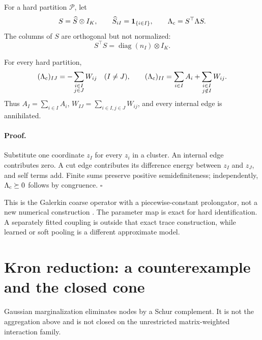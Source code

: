 For a hard partition \(\mathcal P\), let
\[
S=\widehat S\otimes I_K,\qquad
\widehat S_{iI}=\mathbf1_{\{i\in I\}},\qquad
\Lambda_{\rm c}=S^\top\Lambda S.
\]
The columns of \(S\) are orthogonal but not normalized:
\begin{equation}
S^\top S=\operatorname{diag}(n_I)\otimes I_K.
\label{eq:cg-aggregation-matrix}
\end{equation}

For every hard partition,
\begin{equation}
(\Lambda_{\rm c})_{IJ}
=-\sum_{\substack{i\in I\\j\in J}}W_{ij}\quad(I\neq J),
\qquad
(\Lambda_{\rm c})_{II}
=\sum_{i\in I}A_i
+\sum_{\substack{i\in I\\j\notin I}}W_{ij}.
\label{eq:cg-coarse-blocks}
\end{equation}
Thus \(A_I=\sum_{i\in I}A_i\),
\(W_{IJ}=\sum_{i\in I,j\in J}W_{ij}\), and every internal edge is
annihilated. 

\paragraph{Proof.}
Substitute one coordinate \(z_I\) for every \(z_i\) in a cluster. An internal
edge contributes zero. A cut edge contributes its difference energy between
\(z_I\) and \(z_J\), and self terms add. Finite sums preserve positive
semidefiniteness; independently,
\(\Lambda_{\rm c}\succeq0\) follows by congruence. \(\square\)

This is the Galerkin coarse operator with a piecewise-constant prolongator,
not a new numerical construction \citep{VanekMandelBrezina1996,Lee2024AMGSystems}.
The parameter map is exact for hard identification. A separately fitted
coupling is outside that exact trace construction, while learned or soft
pooling is a different approximate model. 

\section{Kron reduction: a counterexample and the closed cone}
\label{sec:cg-kron}

Gaussian marginalization eliminates nodes by a Schur complement. It is not
the aggregation above and is not closed on the unrestricted matrix-weighted
interaction family.

